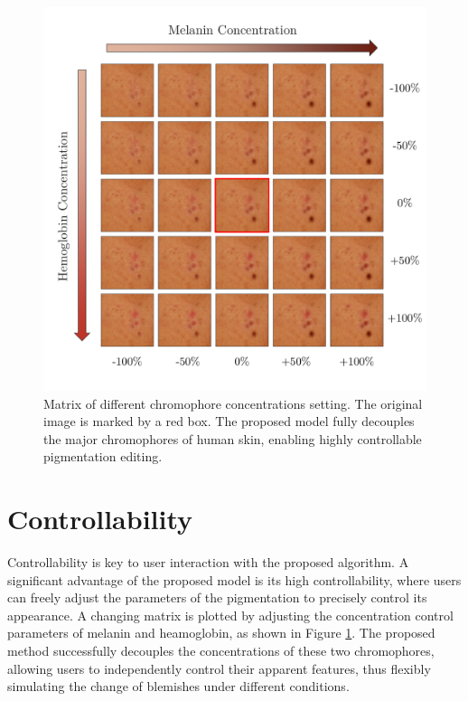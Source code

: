 \begin{spacing}{1.5}
\begin{figure}[t!]
    \centering
    \includegraphics[width=0.96\columnwidth]{Chapter5/grid.pdf}
    \caption{Matrix of different chromophore concentrations setting. The original image is marked by a red box. The proposed model fully decouples the major chromophores of human skin, enabling highly controllable pigmentation editing.}
    \label{fig:matrix}
\end{figure}

\section{Controllability}
Controllability is key to user interaction with the proposed algorithm. A significant advantage of the proposed model is its high controllability, where users can freely adjust the parameters of the pigmentation to precisely control its appearance.
A changing matrix is plotted by adjusting the concentration control parameters of melanin and heamoglobin, as shown in Figure \ref{fig:matrix}. The proposed method successfully decouples the concentrations of these two chromophores, allowing users to independently control their apparent features, thus flexibly simulating the change of blemishes under different conditions.


\end{spacing}
